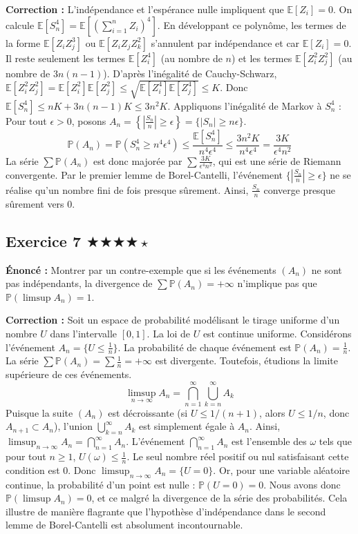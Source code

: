 \documentclass[11pt,a4paper]{article}
\begin{document}
\textbf{Correction :}
L'indépendance et l'espérance nulle impliquent que $\mathbb{E}[Z_i] = 0$.
On calcule $\mathbb{E}[S_n^4] = \mathbb{E}\left[ \left(\sum_{i=1}^n Z_i\right)^4 \right]$.
En développant ce polynôme, les termes de la forme $\mathbb{E}[Z_i Z_j^3]$ ou $\mathbb{E}[Z_i Z_j Z_k^2]$ s'annulent par indépendance et car $\mathbb{E}[Z_i]=0$.
Il reste seulement les termes $\mathbb{E}[Z_i^4]$ (au nombre de $n$) et les termes $\mathbb{E}[Z_i^2 Z_j^2]$ (au nombre de $3n(n-1)$).
D'après l'inégalité de Cauchy-Schwarz, $\mathbb{E}[Z_i^2 Z_j^2] = \mathbb{E}[Z_i^2]\mathbb{E}[Z_j^2] \le \sqrt{\mathbb{E}[Z_i^4]\mathbb{E}[Z_j^4]} \le K$.
Donc $\mathbb{E}[S_n^4] \le nK + 3n(n-1)K \le 3n^2K$.
Appliquons l'inégalité de Markov à $S_n^4$ :
Pour tout $\epsilon > 0$, posons $A_n = \left\{ \left|\frac{S_n}{n}\right| \ge \epsilon \right\} = \{ |S_n| \ge n\epsilon \}$.
$$ \mathbb{P}(A_n) = \mathbb{P}(S_n^4 \ge n^4\epsilon^4) \le \frac{\mathbb{E}[S_n^4]}{n^4\epsilon^4} \le \frac{3n^2K}{n^4\epsilon^4} = \frac{3K}{\epsilon^4 n^2} $$
La série $\sum \mathbb{P}(A_n)$ est donc majorée par $\sum \frac{3K}{\epsilon^4 n^2}$, qui est une série de Riemann convergente.
Par le premier lemme de Borel-Cantelli, l'événement $\{ |\frac{S_n}{n}| \ge \epsilon \}$ ne se réalise qu'un nombre fini de fois presque sûrement.
Ainsi, $\frac{S_n}{n}$ converge presque sûrement vers 0.


\subsection*{Exercice 7 \quad $\bigstar\bigstar\bigstar\bigstar\star$}


\textbf{Énoncé :}
Montrer par un contre-exemple que si les événements $(A_n)$ ne sont pas indépendants, la divergence de $\sum \mathbb{P}(A_n) = +\infty$ n'implique pas que $\mathbb{P}(\limsup A_n) = 1$.

\textbf{Correction :}
Soit un espace de probabilité modélisant le tirage uniforme d'un nombre $U$ dans l'intervalle $[0, 1]$. La loi de $U$ est continue uniforme.
Considérons l'événement $A_n = \{ U \le \frac{1}{n} \}$.
La probabilité de chaque événement est $\mathbb{P}(A_n) = \frac{1}{n}$.
La série $\sum \mathbb{P}(A_n) = \sum \frac{1}{n} = +\infty$ est divergente.
Toutefois, étudions la limite supérieure de ces événements.
$$ \limsup_{n \to \infty} A_n = \bigcap_{n=1}^\infty \bigcup_{k=n}^\infty A_k $$
Puisque la suite $(A_n)$ est décroissante (si $U \le 1/(n+1)$, alors $U \le 1/n$, donc $A_{n+1} \subset A_n$), l'union $\bigcup_{k=n}^\infty A_k$ est simplement égale à $A_n$.
Ainsi, $\limsup_{n \to \infty} A_n = \bigcap_{n=1}^\infty A_n$.
L'événement $\bigcap_{n=1}^\infty A_n$ est l'ensemble des $\omega$ tels que pour tout $n \ge 1$, $U(\omega) \le \frac{1}{n}$.
Le seul nombre réel positif ou nul satisfaisant cette condition est $0$.
Donc $\limsup_{n \to \infty} A_n = \{ U = 0 \}$.
Or, pour une variable aléatoire continue, la probabilité d'un point est nulle : $\mathbb{P}(U = 0) = 0$.
Nous avons donc $\mathbb{P}(\limsup A_n) = 0$, et ce malgré la divergence de la série des probabilités.
Cela illustre de manière flagrante que l'hypothèse d'indépendance dans le second lemme de Borel-Cantelli est absolument incontournable.
\end{document}
